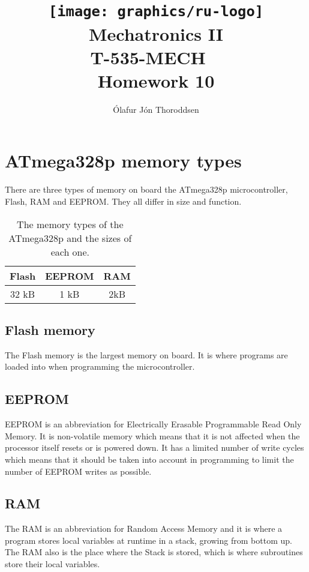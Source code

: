 \documentclass[11pt,a4paper,titlepage]{article}
\author{Ólafur Jón Thoroddsen}  %
\title{\texttt{[image: graphics/ru-logo]}\\\vspace{10mm}
	Mechatronics II\\T-535-MECH \ \\Homework 10}  %
\begin{document}
	\maketitle
	
	\tableofcontents
	\pagebreak
	
	\section{ATmega328p memory types}
	
	There are three types of memory on board the ATmega328p microcontroller, Flash, RAM and EEPROM. They all differ in size and function.
	
	\begin{table}[H]
		\centering
		\begin{tabular}{ccc}
			\toprule
			Flash	&	EEPROM	&	RAM	\\
			\midrule
			32 kB	&	1 kB	&	2kB	\\
			\bottomrule
		\end{tabular}
		\caption{The memory types of the ATmega328p and the sizes of each one.}
		\label{tab:memory}
	\end{table}
	
	\subsection{Flash memory}
	The Flash memory is the largest memory on board. It is where programs are loaded into when programming  the microcontroller.
	
	\subsection{EEPROM}
	\textsc{EEPROM} is an abbreviation for Electrically Erasable Programmable Read Only Memory. It is non-volatile memory which means that it is not affected when the processor itself resets or is powered down. It has a limited number of write cycles which means that it should be taken into account in programming to limit the number of \textsc{EEPROM} writes as possible.
	
	\subsection{RAM}
	The \textsc{RAM} is an abbreviation for Random Access Memory and it is where a program stores local variables at runtime in a stack, growing from bottom up. The \textsc{RAM} also is the place where the Stack is stored, which is where subroutines store their local variables.
	
\end{document}
